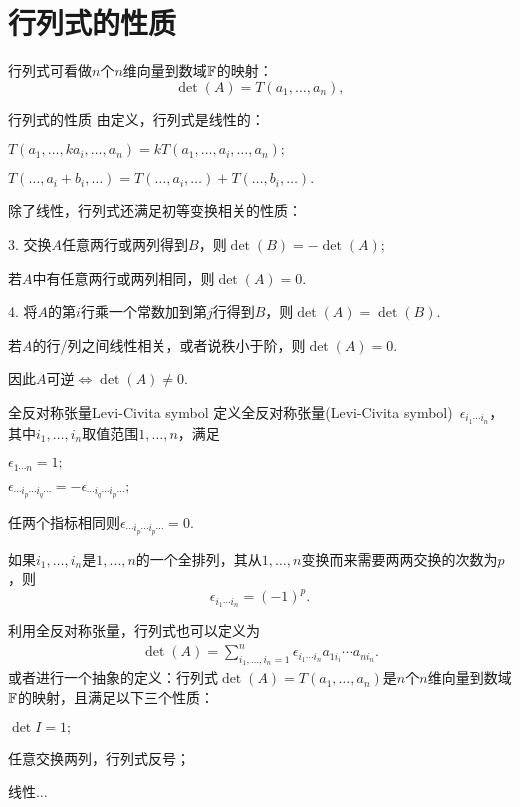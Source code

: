 \section{行列式的性质}
行列式可看做$n$个$n$维向量到数域$\mathbb F$的映射：
\[
	\det (A)=T(a_1,\ldots,a_n),
\]
\begin{theorem}{行列式的性质}{}
	由定义，行列式是线性的：
	\begin{compactenum}
		\item $T(a_1,\ldots,ka_i,\ldots,a_n)=kT(a_1,\ldots,a_i,\ldots,a_n);$
		\item $T(\ldots,a_i+b_i,\ldots)=T(\ldots,a_i,\ldots)+T(\ldots,b_i,\ldots).$
	\end{compactenum}
	除了线性，行列式还满足初等变换相关的性质：
	\begin{compactenum}
		\item[3.] 交换$A$任意两行或两列得到$B$，则$\det(B)=-\det(A);$
		\begin{corollary}
			若$A$中有任意两行或两列相同，则$\det(A)=0.$
		\end{corollary}
		\item[4.] 将$A$的第$i$行乘一个常数加到第$j$行得到$B$，则$\det(A)=\det(B).$
		\begin{corollary}
			若$A$的行/列之间线性相关，或者说秩小于阶，则$\det (A)=0.$
		\end{corollary}
	\end{compactenum}
\end{theorem}
因此$A$可逆$\iff\det(A)\neq 0.$
\begin{definition}{全反对称张量}{Levi-Civita symbol}
	定义全反对称张量(Levi-Civita symbol)~$\epsilon_{i_1\cdots i_n}$，其中$i_1,\ldots,i_n$取值范围$1,\ldots,n$，满足
	\begin{compactitem}
		\item $\epsilon_{1\cdots n}=1;$
		\item $\epsilon_{\cdots i_p\cdots i_q\cdots}=-\epsilon_{\cdots i_q\cdots i_p\cdots};$
		\item 任两个指标相同则$\epsilon_{\cdots i_p\cdots i_p\cdots}=0.$
	\end{compactitem}
	如果$i_1,\ldots,i_n$是$1,\ldots,n$的一个全排列，其从$1,\ldots,n$变换而来需要两两交换的次数为$p$，则 
	\[
		\epsilon_{i_1\cdots i_n}=(-1)^p.
	\]
\end{definition}
利用全反对称张量，行列式也可以定义为
\begin{align}
	\det(A)=\sum_{i_1,\ldots,i_n=1}^n\epsilon_{i_1\cdots i_n}a_{1i_i}\cdots a_{ni_n}.
\end{align}
或者进行一个抽象的定义：行列式$\det(A)=T(a_1,\ldots,a_n)$是$n$个$n$维向量到数域$\mathbb F$的映射，且满足以下三个性质：
\begin{compactenum}
	\item $\det I=1;$
	\item 任意交换两列，行列式反号；
	\item 线性$\ldots$
\end{compactenum}

